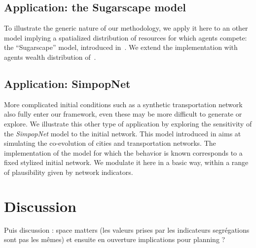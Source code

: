 \documentclass[a4paper,12pt]{article}
\begin{document}
\subsection{Application: the Sugarscape model}

To illustrate the generic nature of our methodology, we apply it here to an other model implying a spatialized distribution of resources for which agents compete: the ``Sugarscape'' model, introduced in~\cite{epstein1996growing}. We extend the implementation with agents wealth distribution of~\cite{li2009netlogo}.




\subsection{Application: SimpopNet}

More complicated initial conditions such as a synthetic transportation network also fully enter our framework, even these may be more difficult to generate or explore. We illustrate this other type of application by exploring the sensitivity of the \emph{SimpopNet} model to the initial network. This model introduced in \cite{schmitt2014modelisation} aims at simulating the co-evolution of cities and transportation networks. The implementation of the model for which the behavior is known corresponds to a fixed stylized initial network. We modulate it here in a basic way, within a range of plausibility given by network indicators.








\section{Discussion}

Puis discussion : space matters (les valeurs prises par les indicateurs segrégations sont pas les mêmes) et ensuite en ouverture implications pour planning ?








\end{document}
